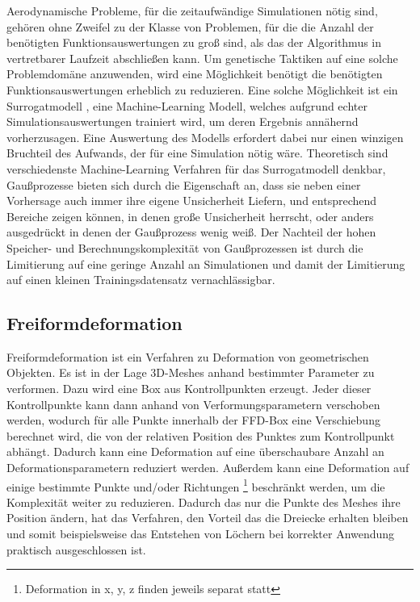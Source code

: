 \documentclass[12pt]{article}
\begin{document}
Aerodynamische Probleme, für die zeitaufwändige Simulationen nötig sind, gehören ohne Zweifel zu der Klasse von Problemen, für die die Anzahl der benötigten Funktionsauswertungen zu groß sind, als das der Algorithmus in vertretbarer Laufzeit abschließen kann.
Um genetische Taktiken auf eine solche Problemdomäne anzuwenden, wird eine Möglichkeit benötigt die benötigten Funktionsauswertungen erheblich zu reduzieren.
Eine solche Möglichkeit ist ein Surrogatmodell \cite{Jin.2011}\cite{Preen.2016}, eine Machine-Learning Modell, welches aufgrund echter Simulationsauswertungen trainiert wird, um deren Ergebnis annähernd vorherzusagen.
Eine Auswertung des Modells erfordert dabei nur einen winzigen Bruchteil des Aufwands, der für eine Simulation nötig wäre.
Theoretisch sind verschiedenste Machine-Learning Verfahren für das Surrogatmodell denkbar, Gaußprozesse \cite{Rasmussen.2008} bieten sich durch die Eigenschaft an, dass sie neben einer Vorhersage auch immer ihre eigene Unsicherheit Liefern, und entsprechend Bereiche zeigen können, in denen große Unsicherheit herrscht, oder anders ausgedrückt in denen der Gaußprozess wenig weiß.
Der Nachteil der hohen Speicher- und Berechnungskomplexität von Gaußprozessen ist durch die Limitierung auf eine geringe Anzahl an Simulationen und damit der Limitierung auf einen kleinen Trainingsdatensatz vernachlässigbar.

\subsection{Freiformdeformation}

Freiformdeformation\cite{Sederberg.1986} ist ein Verfahren zu Deformation von geometrischen Objekten.
Es ist in der Lage 3D-Meshes anhand bestimmter Parameter zu verformen.
Dazu wird eine Box aus Kontrollpunkten erzeugt.
Jeder dieser Kontrollpunkte kann dann anhand von Verformungsparametern verschoben werden, wodurch für alle Punkte innerhalb der FFD-Box eine Verschiebung berechnet wird, die von der relativen Position des Punktes zum Kontrollpunkt abhängt.
Dadurch kann eine Deformation auf eine überschaubare Anzahl an Deformationsparametern reduziert werden.
Außerdem kann eine Deformation auf einige bestimmte Punkte und/oder Richtungen
\footnote{Deformation in x, y, z finden jeweils separat statt}
beschränkt werden, um die Komplexität weiter zu reduzieren.
Dadurch das nur die Punkte des Meshes ihre Position ändern, hat das Verfahren, den Vorteil das die Dreiecke erhalten bleiben und somit beispielsweise das Entstehen von Löchern bei korrekter Anwendung praktisch ausgeschlossen ist.
\end{document}
